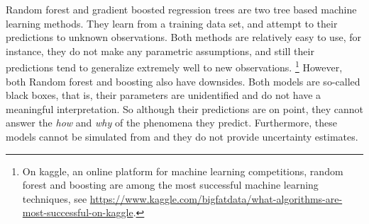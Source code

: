 \documentclass[a4paper,usenames,dvipsnames]{article}
\newenvironment{revision}{\color{teal}}{\color{black}}
\begin{document}
\begin{revision}
Random forest and gradient boosted regression trees are two tree based machine learning methods.
They learn from a training data set, and attempt to their predictions to unknown observations.
Both methods are relatively easy to use, for instance, they do not make any parametric assumptions, and still their predictions tend to generalize extremely well to new observations.
\footnote{\begin{revision}On kaggle, an online platform for machine learning competitions, random forest and boosting are among the most successful machine learning techniques, see \url{https://www.kaggle.com/bigfatdata/what-algorithms-are-most-successful-on-kaggle}.\end{revision}}
However, both Random forest and boosting also have downsides.
Both models are so-called black boxes, that is, their parameters are unidentified and do not have a meaningful interpretation. So although their predictions are on point, they cannot answer the \emph{how} and \emph{why} of the phenomena they predict. Furthermore, these models cannot be simulated from and they do not provide uncertainty estimates.
\end{revision}
\end{document}

